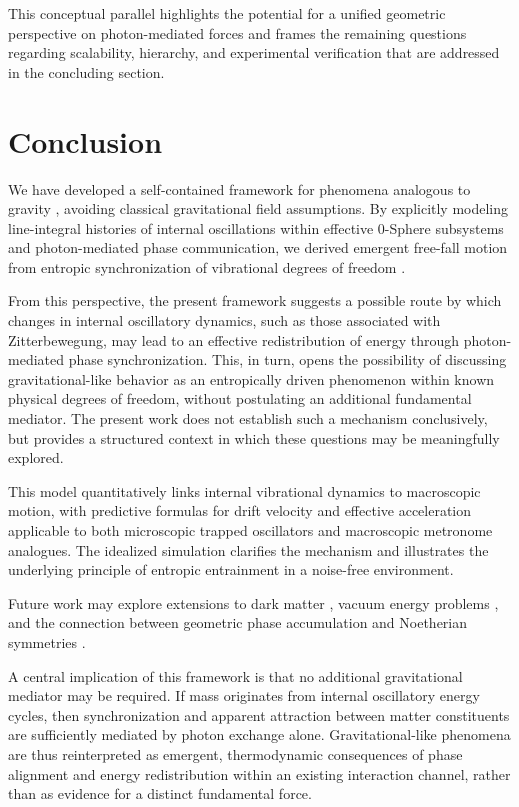 \documentclass[%
 reprint,
 amsmath,amssymb,
 aps,
 prb,
]{revtex4-2}
\numberwithin{equation}{section}
\begin{document}
This conceptual parallel highlights the potential for a unified geometric perspective on photon-mediated forces and frames the remaining questions regarding scalability, hierarchy, and experimental verification that are addressed in the concluding section.

\section{Conclusion}
\label{sec:conclusion}

We have developed a self-contained framework for phenomena analogous to gravity \cite{Hanamura2026Trilogy3,Hanamura2025Trilogy1,Hanamura2026Trilogy2}, avoiding classical gravitational field assumptions. By explicitly modeling line-integral histories of internal oscillations within effective 0-Sphere subsystems and photon-mediated phase communication, we derived emergent free-fall motion from entropic synchronization of vibrational degrees of freedom \cite{Pikovsky2001,Strogatz2000,Bennett2002,Jacobson1995,Verlinde2011,Padmanabhan2010}.

From this perspective, the present framework suggests a possible route by which changes in internal oscillatory dynamics, such as those associated with Zitterbewegung, may lead to an effective redistribution of energy through photon-mediated phase synchronization. This, in turn, opens the possibility of discussing gravitational-like behavior as an entropically driven phenomenon within known physical degrees of freedom, without postulating an additional fundamental mediator. The present work does not establish such a mechanism conclusively, but provides a structured context in which these questions may be meaningfully explored.

This model quantitatively links internal vibrational dynamics to macroscopic motion, with predictive formulas for drift velocity and effective acceleration applicable to both microscopic trapped oscillators and macroscopic metronome analogues. The idealized simulation clarifies the mechanism and illustrates the underlying principle of entropic entrainment in a noise-free environment.

Future work may explore extensions to dark matter \cite{Hanamura2025Spin}, vacuum energy problems \cite{Hanamura2026Vacuum}, and the connection between geometric phase accumulation and Noetherian symmetries \cite{Hanamura2025Noetherian}.

A central implication of this framework is that no additional gravitational mediator may be required. If mass originates from internal oscillatory energy cycles, then synchronization and apparent attraction between matter constituents are sufficiently mediated by photon exchange alone. Gravitational-like phenomena are thus reinterpreted as emergent, thermodynamic consequences of phase alignment and energy redistribution within an existing interaction channel, rather than as evidence for a distinct fundamental force.
\end{document}
